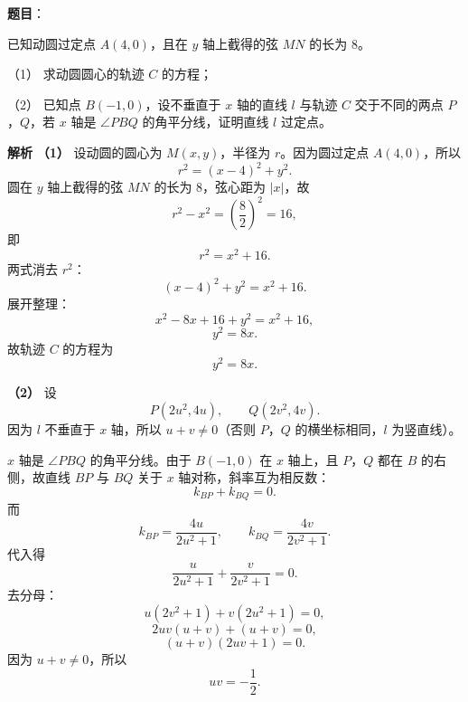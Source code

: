 \begin{answer}


\end{answer}
\begin{answer}

\textbf{题目}：

已知动圆过定点 $A(4,0)$，且在 $y$ 轴上截得的弦 $MN$ 的长为 $8$。

（1） 求动圆圆心的轨迹 $C$ 的方程；

（2） 已知点 $B(-1,0)$，设不垂直于 $x$ 轴的直线 $l$ 与轨迹 $C$ 交于不同的两点 $P$，$Q$，若 $x$ 轴是 $\angle PBQ$ 的角平分线，证明直线 $l$ 过定点。

\textbf{解析}
\textbf{（1）} 设动圆的圆心为 $M(x,y)$，半径为 $r$。因为圆过定点 $A(4,0)$，所以
\nopagebreak[4]
\[r^2=(x-4)^2+y^2.\]
圆在 $y$ 轴上截得的弦 $MN$ 的长为 $8$，弦心距为 $|x|$，故
\nopagebreak[4]
\[r^2-x^2=\left(\frac82\right)^2=16,\]
即
\nopagebreak[4]
\[r^2=x^2+16.\]
两式消去 $r^2$：
\nopagebreak[4]
\[(x-4)^2+y^2=x^2+16.\]
展开整理：
\nopagebreak[4]
\[x^2-8x+16+y^2=x^2+16,\]
\nopagebreak[4]
\[y^2=8x.\]
故轨迹 $C$ 的方程为
\nopagebreak[4]
\[y^2=8x.\]

\textbf{（2）} 设
\nopagebreak[4]
\[P(2u^2,4u),\qquad Q(2v^2,4v).\]
因为 $l$ 不垂直于 $x$ 轴，所以 $u+v\neq0$（否则 $P$，$Q$ 的横坐标相同，$l$ 为竖直线）。

$x$ 轴是 $\angle PBQ$ 的角平分线。由于 $B(-1,0)$ 在 $x$ 轴上，且 $P$，$Q$ 都在 $B$ 的右侧，故直线 $BP$ 与 $BQ$ 关于 $x$ 轴对称，斜率互为相反数：
\nopagebreak[4]
\[k_{BP}+k_{BQ}=0.\]
而
\nopagebreak[4]
\[k_{BP}=\frac{4u}{2u^2+1},\qquad
k_{BQ}=\frac{4v}{2v^2+1}.\]
代入得
\nopagebreak[4]
\[\frac{u}{2u^2+1}+\frac{v}{2v^2+1}=0.\]
去分母：
\nopagebreak[4]
\[u(2v^2+1)+v(2u^2+1)=0,\]
\nopagebreak[4]
\[2uv(u+v)+(u+v)=0,\]
\nopagebreak[4]
\[(u+v)(2uv+1)=0.\]
因为 $u+v\neq0$，所以
\nopagebreak[4]
\[uv=-\frac12.\]


\end{answer}
